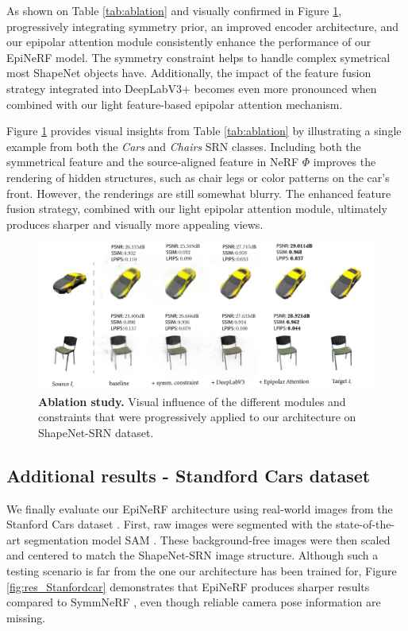As shown on Table \ref{tab:ablation} and visually confirmed in Figure \ref{fig:ablation}, progressively integrating symmetry prior, an improved encoder architecture, and our epipolar attention module consistently enhance the performance of our EpiNeRF model. The symmetry constraint helps to handle complex symetrical most ShapeNet objects have. Additionally, the impact of the feature fusion strategy integrated into DeepLabV3+ becomes even more pronounced when combined with our light feature-based epipolar attention mechanism. 

Figure \ref{fig:ablation} provides visual insights from Table \ref{tab:ablation} by illustrating a single example from both the \textit{Cars} and \textit{Chairs} SRN classes. Including both the symmetrical feature and the source-aligned feature in NeRF $\Phi$ improves the rendering of hidden structures, such as chair legs or color patterns on the car’s front. However, the renderings are still somewhat blurry. The enhanced feature fusion strategy, combined with our light epipolar attention module, ultimately produces sharper and visually more appealing views. \newline 


\begin{figure}[h!]
    \begin{center}
  \includegraphics[width=\linewidth]{images/epinerf/supp_ablation_illustration.png}
  \caption{\textbf{Ablation study.} Visual influence of the different modules and constraints that were progressively applied to our architecture on ShapeNet-SRN dataset.}
  \label{fig:ablation}
  \end{center}
\end{figure}  


\subsection{Additional results - Standford Cars dataset }
We finally evaluate our EpiNeRF architecture using real-world images from the Stanford Cars dataset  \cite{krause20133d}. First, raw images were segmented with the state-of-the-art segmentation model SAM \cite{kirillov2023segment}. These background-free images were then scaled and centered to match the ShapeNet-SRN image structure. Although such a testing scenario is far from the one our architecture has been trained for, Figure \ref{fig:res_Stanfordcar} demonstrates that EpiNeRF produces sharper results compared to SymmNeRF \cite{li2022symmnerf}, even though reliable camera pose information are missing.


